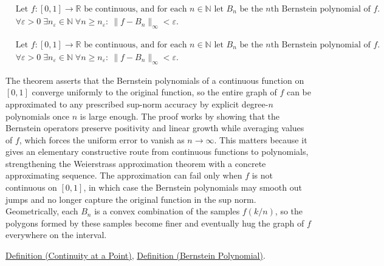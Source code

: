 \begin{remark*}
\[
\begin{aligned}
&\text{Let } f:[0,1]\to\mathbb{R} \text{ be continuous, and for each } n\in\mathbb{N} \text{ let } B_n \text{ be the $n$th Bernstein polynomial of } f.\\
&\forall \varepsilon>0\;\exists n_\varepsilon\in\mathbb{N}\;\forall n\ge n_\varepsilon:\ \|f-B_n\|_\infty<\varepsilon.
\end{aligned}
\]
\end{remark*}

\begin{remark*}
\[
\begin{aligned}
&\text{Let } f:[0,1]\to\mathbb{R} \text{ be continuous, and for each } n\in\mathbb{N} \text{ let } B_n \text{ be the $n$th Bernstein polynomial of } f.\\
&\forall \varepsilon>0\;\exists n_\varepsilon\in\mathbb{N}\;\forall n\ge n_\varepsilon:\ \|f-B_n\|_\infty<\varepsilon.
\end{aligned}
\]
\end{remark*}

\begin{remark*}[Interpretation]
The theorem asserts that the Bernstein polynomials of a continuous function on $[0,1]$ converge uniformly to the original function, so the entire graph of $f$ can be approximated to any prescribed sup-norm accuracy by explicit degree-$n$ polynomials once $n$ is large enough. The proof works by showing that the Bernstein operators preserve positivity and linear growth while averaging values of $f$, which forces the uniform error to vanish as $n\to\infty$. This matters because it gives an elementary constructive route from continuous functions to polynomials, strengthening the Weierstrass approximation theorem with a concrete approximating sequence. The approximation can fail only when $f$ is not continuous on $[0,1]$, in which case the Bernstein polynomials may smooth out jumps and no longer capture the original function in the sup norm. Geometrically, each $B_n$ is a convex combination of the samples $f(k/n)$, so the polygons formed by these samples become finer and eventually hug the graph of $f$ everywhere on the interval.
\end{remark*}

\begin{dependencies}
\hyperref[def:continuous-at-point]{Definition (Continuity at a Point)}, \hyperref[def:bernstein-polynomial]{Definition (Bernstein Polynomial)}.
\end{dependencies}

